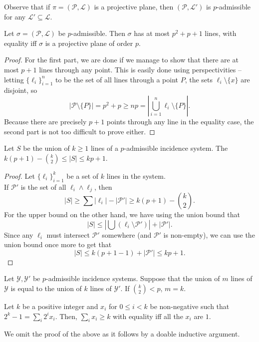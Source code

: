 	Observe that if $\pi = (\mathcal{P},\mathcal{L})$ is a projective plane, then $(\mathcal{P},\mathcal{L}')$ is $p$-admissible for any $\mathcal{L}'\subseteq\mathcal{L}$.

	\begin{lemma}
		Let $\sigma = (\mathcal{P},\mathcal{L})$ be $p$-admissible. Then $\sigma$ has at most $p^2+p+1$ lines, with equality iff $\sigma$ is a projective plane of order $p$.
	\end{lemma}
	\begin{proof}
		For the first part, we are done if we manage to show that there are at most $p+1$ lines through any point. This is easily done using perspectivities -- letting $\{\ell_i\}_{i=1}^n$ to be the set of all lines through a point $P$, the sets $\ell_i \setminus \{x\}$ are disjoint, so 
		\[ |\mathcal{P} \setminus \{P\}| = p^2 + p \ge np = \left| \bigcup_{i=1}^n \ell_i \setminus \{P\} \right|. \]
		Because there are precisely $p+1$ points through any line in the equality case, the second part is not too difficult to prove either.
	\end{proof}

	\begin{lemma}
		Let $S$ be the union of $k \ge 1$ lines of a $p$-admissible incidence system. The  $k(p+1) - \binom{k}{2} \le |S| \le kp+1$.
	\end{lemma}
	\begin{proof}
		Let $\{\ell_i\}_{i=1}^k$ be a set of $k$ lines in the system.\\
		If $\mathcal{P}'$ is the set of all $\ell_i \land \ell_j$, then
		\[ |S| \ge \sum |\ell_i| - |\mathcal{P'}| \ge k(p+1) - \binom{k}{2}. \]
		For the upper bound on the other hand, we have using the union bound that
		\[ |S| \le \left| \bigcup (\ell_i \setminus \mathcal{P}') \right| + |\mathcal{P}'|. \]
		Since any $\ell_i$ must intersect $\mathcal{P}'$ somewhere (and $\mathcal{P}'$ is non-empty), we can use the union bound once more to get that
		\[ |S| \le k(p+1-1) + |\mathcal{P}'| \le kp + 1. \]
	\end{proof}

	\begin{lemma}
		\label{lemma: if union of lines same number of lines}
		Let $\mathcal{Y},\mathcal{Y}'$ be $p$-admissible incidence systems. Suppose that the union of $m$ lines of $\mathcal{Y}$ is equal to the union of $k$ lines of $\mathcal{Y}'$. If $\binom{k}{2} < p$, $m = k$.
	\end{lemma}

	\begin{lemma}
		\label{lem: binary rep border}
		Let $k$ be a positive integer and $x_i$ for $0 \le i < k$ be non-negative such that $2^k - 1 = \sum_i 2^i x_i$. Then, $\sum_i x_i \ge k$ with equality iff all the $x_i$ are $1$.
	\end{lemma}
	We omit the proof of the above as it follows by a doable inductive argument.

